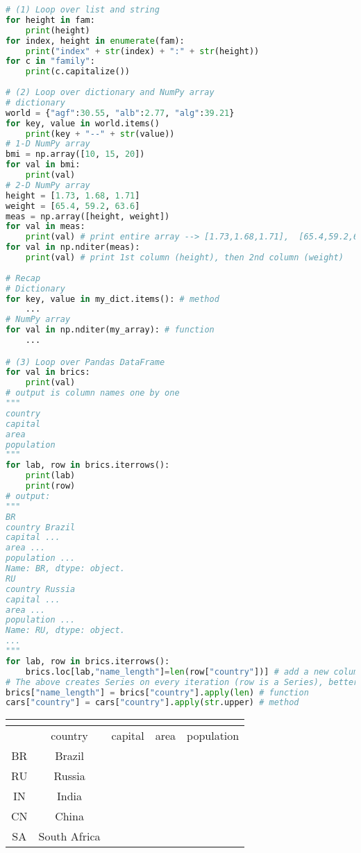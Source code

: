 \documentclass[12pt]{article}
\begin{document}
\begin{lstlisting}[language=Python]
# (1) Loop over list and string
for height in fam:
    print(height)
for index, height in enumerate(fam):
    print("index" + str(index) + ":" + str(height)) 
for c in "family":
    print(c.capitalize())
    
# (2) Loop over dictionary and NumPy array
# dictionary
world = {"agf":30.55, "alb":2.77, "alg":39.21}
for key, value in world.items()
    print(key + "--" + str(value))
# 1-D NumPy array
bmi = np.array([10, 15, 20])
for val in bmi:
    print(val)
# 2-D NumPy array
height = [1.73, 1.68, 1.71]
weight = [65.4, 59.2, 63.6]
meas = np.array([height, weight])
for val in meas:
    print(val) # print entire array --> [1.73,1.68,1.71],  [65.4,59.2,63.6]
for val in np.nditer(meas):
    print(val) # print 1st column (height), then 2nd column (weight)
    
# Recap
# Dictionary
for key, value in my_dict.items(): # method
    ...
# NumPy array
for val in np.nditer(my_array): # function
    ...

# (3) Loop over Pandas DataFrame
for val in brics:
    print(val)
# output is column names one by one
""" 
country
capital
area
population
"""
for lab, row in brics.iterrows():
    print(lab)
    print(row)
# output:
"""
BR
country Brazil
capital ...
area ...
population ...
Name: BR, dtype: object.
RU
country Russia
capital ...
area ...
population ...
Name: RU, dtype: object.
...
"""
for lab, row in brics.iterrows():
    brics.loc[lab,"name_length"]=len(row["country"])] # add a new column
# The above creates Series on every iteration (row is a Series), better way is the following
brics["name_length"] = brics["country"].apply(len) # function
cars["country"] = cars["country"].apply(str.upper) # method
\end{lstlisting}

\begin{table}[!ht]
\centering
\begin{tabular}{c | c | c | c | c }
\multicolumn{5}{l}{} \\ [-10pt]
\hline\hline
& country & capital & area & population \\
\hline
BR & Brazil & & &  \\
RU & Russia & & &  \\
IN & India & & &  \\
CN & China & & &  \\
SA & South Africa & & &  \\
\hline
\end{tabular}
\end{table}
\end{document}
